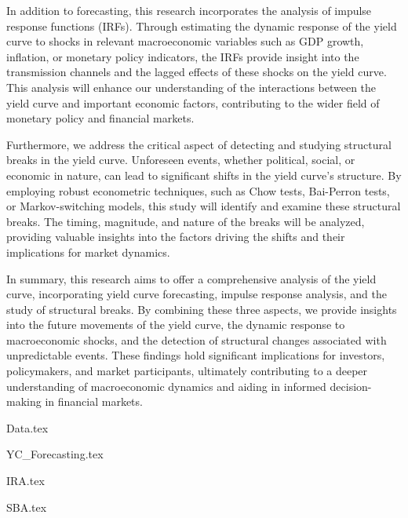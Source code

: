 \documentclass{vegaarticle}
\begin{document}
        In addition to forecasting, this research incorporates the analysis of impulse response functions (IRFs).
        Through estimating the dynamic response of the yield curve to shocks in relevant macroeconomic variables such as
        GDP growth, inflation, or monetary policy indicators, the IRFs provide insight into the transmission channels
        and the lagged effects of these shocks on the yield curve. This analysis will enhance our understanding of the
        interactions between the yield curve and important economic factors, contributing to the wider field of monetary
        policy and financial markets.
        
        Furthermore, we address the critical aspect of detecting and studying structural breaks in the yield curve.
        Unforeseen events, whether political, social, or economic in nature, can lead to significant shifts in the yield
        curve's structure. By employing robust econometric techniques, such as Chow tests, Bai-Perron tests, or
        Markov-switching models, this study will identify and examine these structural breaks. The timing, magnitude,
        and nature of the breaks will be analyzed, providing valuable insights into the factors driving the shifts and
        their implications for market dynamics.
        
        In summary, this research aims to offer a comprehensive analysis of the yield curve, incorporating yield curve
        forecasting, impulse response analysis, and the study of structural breaks. By combining these three aspects,
        we provide insights into the future movements of the yield curve, the dynamic response to macroeconomic shocks,
        and the detection of structural changes associated with unpredictable events. These findings hold significant
        implications for investors, policymakers, and market participants, ultimately contributing to a deeper
        understanding of macroeconomic dynamics and aiding in informed decision-making in financial markets.


    {Data.tex}

    {YC_Forecasting.tex}

    {IRA.tex}

    {SBA.tex}
\end{document}
